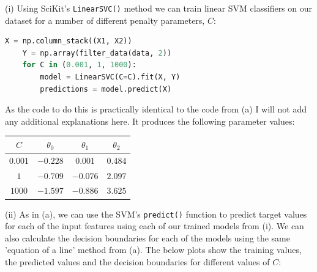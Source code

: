 \documentclass[12pt]{article}
\begin{document}
\noindent (i) Using SciKit's \texttt{LinearSVC()} method we can train linear SVM classifiers on our dataset for a number of different penalty parameters, $C$:

\begin{center}
    \lstset{basicstyle=\footnotesize}
    \begin{lstlisting}[language=Python]
    X = np.column_stack((X1, X2))
    Y = np.array(filter_data(data, 2))
    for C in (0.001, 1, 1000):
        model = LinearSVC(C=C).fit(X, Y)
        predictions = model.predict(X)
    \end{lstlisting}
\end{center}
As the code to do this is practically identical to the code from (a) I will not add any additional explanations here. It produces the following parameter values:

\begin{center}
    \begin{tabular}{|c|c|c|c|}
        \hline
        $C$ & $\theta_0$ & $\theta_1$ & $\theta_2$ \\
        \hline
        $0.001$ & $-0.228$ & $0.001$ & $0.484$ \\
        $1$ & $-0.709$ & $-0.076$ & $2.097$ \\
        $1000$ & $-1.597$ & $-0.886$ & $3.625$ \\
        \hline
    \end{tabular}
\end{center}

\noindent (ii) As in (a), we can use the SVM's \texttt{predict()} function to predict target values for each of the input features using each of our trained models from (i). We can also calculate the decision boundaries for each of the models using the same 'equation of a line' method from (a). The below plots show the training values, the predicted values and the decision boundaries for different values of $C$:
\end{document}
